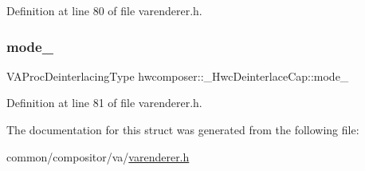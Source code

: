 Definition at line 80 of file varenderer.\+h.

\mbox{\label{structhwcomposer_1_1__HwcDeinterlaceCap_a188e0d349ff3c40e27be247592dfbcbc}} 
\subsubsection{\texorpdfstring{mode\+\_\+}{mode\_}}
{\footnotesize\ttfamily V\+A\+Proc\+Deinterlacing\+Type hwcomposer\+::\+\_\+\+Hwc\+Deinterlace\+Cap\+::mode\+\_\+}



Definition at line 81 of file varenderer.\+h.



The documentation for this struct was generated from the following file\+:\begin{DoxyCompactItemize}
\item 
common/compositor/va/\mbox{\hyperlink{varenderer_8h}{varenderer.\+h}}\end{DoxyCompactItemize}
